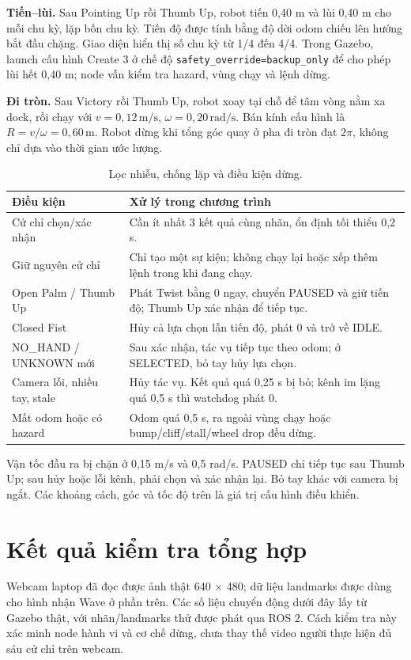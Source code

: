 \documentclass[a4paper,11pt]{article}
\newcommand{\code}[1]{\nolinkurl{#1}}
\begin{document}
\textbf{Tiến--lùi.} Sau Pointing Up rồi Thumb Up, robot tiến 0,40 m và lùi 0,40 m
cho mỗi chu kỳ, lặp bốn chu kỳ. Tiến độ được tính bằng độ dời odom chiếu lên hướng
bắt đầu chặng. Giao diện hiển thị số chu kỳ từ 1/4 đến 4/4.
Trong Gazebo, launch cấu hình Create 3 ở chế độ \code{safety_override=backup_only}
để cho phép lùi hết 0,40 m; node vẫn kiểm tra hazard, vùng chạy và lệnh dừng.

\textbf{Đi tròn.} Sau Victory rồi Thumb Up, robot xoay tại chỗ để tâm vòng nằm xa
dock, rồi chạy với \(v=0{,}12\,\mathrm{m/s}\), \(\omega=0{,}20\,\mathrm{rad/s}\).
Bán kính cấu hình là \(R=v/\omega=0{,}60\,\mathrm{m}\). Robot dừng khi tổng góc quay
ở pha đi tròn đạt \(2\pi\), không chỉ dựa vào thời gian ước lượng.

\begin{table}[H]\centering\small
\begin{tabular}{@{}p{4.5cm}p{11.4cm}@{}}\toprule
Điều kiện & Xử lý trong chương trình\\\midrule
Cử chỉ chọn/xác nhận & Cần ít nhất 3 kết quả cùng nhãn, ổn định tối thiểu 0,2 s.\\
Giữ nguyên cử chỉ & Chỉ tạo một sự kiện; không chạy lại hoặc xếp thêm lệnh trong khi đang chạy.\\
Open Palm / Thumb Up & Phát Twist bằng 0 ngay, chuyển PAUSED và giữ tiến độ; Thumb Up xác nhận để tiếp tục.\\
Closed Fist & Hủy cả lựa chọn lẫn tiến độ, phát 0 và trở về IDLE.\\
NO\_HAND / UNKNOWN mới & Sau xác nhận, tác vụ tiếp tục theo odom; ở SELECTED, bỏ tay hủy lựa chọn.\\
Camera lỗi, nhiều tay, stale & Hủy tác vụ. Kết quả quá 0,25 s bị bỏ; kênh im lặng quá 0,5 s thì watchdog phát 0.\\
Mất odom hoặc có hazard & Odom quá 0,5 s, ra ngoài vùng chạy hoặc bump/cliff/stall/wheel drop đều dừng.\\\bottomrule
\end{tabular}
\caption{Lọc nhiễu, chống lặp và điều kiện dừng.}
\end{table}
Vận tốc đầu ra bị chặn ở 0,15 m/s và 0,5 rad/s. PAUSED chỉ tiếp tục sau Thumb Up;
sau hủy hoặc lỗi kênh, phải chọn và xác nhận lại. Bỏ tay khác với camera bị ngắt.
Các khoảng cách, góc và tốc độ trên là giá trị cấu hình điều khiển.
\clearpage

\section{Kết quả kiểm tra tổng hợp}
Webcam laptop đã đọc được ảnh thật 640 × 480; dữ liệu landmarks được dùng cho
hình nhận Wave ở phần trên. Các số liệu chuyển động dưới đây lấy từ Gazebo thật,
với nhãn/landmarks thử được phát qua ROS 2. Cách kiểm tra này xác minh node hành
vi và cơ chế dừng, chưa thay thế video người thực hiện đủ sáu cử chỉ trên webcam.
\end{document}
